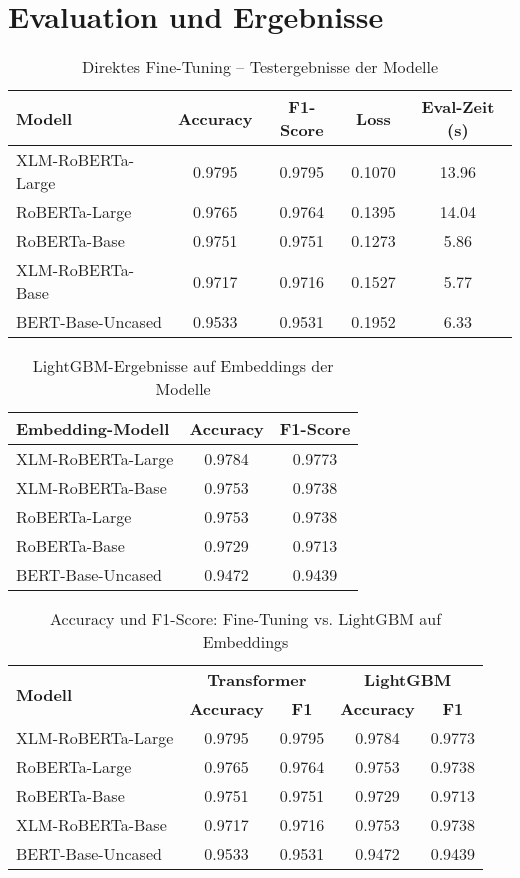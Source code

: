 \chapter{Evaluation und Ergebnisse}
\label{chap:evaluation_und_ergebnisse}


\begin{table}[!ht]
\centering
\begin{tabular}{lcccc}
    \toprule
    \textbf{Modell} & \textbf{Accuracy} & \textbf{F1-Score} & \textbf{Loss} & \textbf{Eval-Zeit (s)} \\
    \midrule
    XLM-RoBERTa-Large & 0.9795 & 0.9795 & 0.1070 & 13.96 \\
    RoBERTa-Large     & 0.9765 & 0.9764 & 0.1395 & 14.04 \\
    RoBERTa-Base      & 0.9751 & 0.9751 & 0.1273 & 5.86 \\
    XLM-RoBERTa-Base  & 0.9717 & 0.9716 & 0.1527 & 5.77 \\
    BERT-Base-Uncased & 0.9533 & 0.9531 & 0.1952 & 6.33 \\
    \bottomrule
\end{tabular}
\caption{Direktes Fine-Tuning – Testergebnisse der Modelle}
\end{table}


\begin{table}[!ht]
\centering
\begin{tabular}{lcc}
    \toprule
    \textbf{Embedding-Modell} & \textbf{Accuracy} & \textbf{F1-Score} \\
    \midrule
    XLM-RoBERTa-Large & 0.9784 & 0.9773 \\
    XLM-RoBERTa-Base  & 0.9753 & 0.9738 \\
    RoBERTa-Large     & 0.9753 & 0.9738 \\
    RoBERTa-Base      & 0.9729 & 0.9713 \\
    BERT-Base-Uncased & 0.9472 & 0.9439 \\
    \bottomrule
\end{tabular}
\caption{LightGBM-Ergebnisse auf Embeddings der Modelle}
\end{table}


\begin{table}[!ht]
\centering
\caption{Accuracy und F1-Score: Fine-Tuning vs. LightGBM auf Embeddings}
\begin{tabular}{lcccc}
\toprule
\multirow{2}{*}{\textbf{Modell}} &
\multicolumn{2}{c}{\textbf{Transformer}} &
\multicolumn{2}{c}{\textbf{LightGBM}} \\
\cmidrule(lr){2-3} \cmidrule(lr){4-5}
 & \textbf{Accuracy} & \textbf{F1} & \textbf{Accuracy} & \textbf{F1} \\
\midrule
XLM-RoBERTa-Large & 0.9795 & 0.9795 & 0.9784 & 0.9773 \\
RoBERTa-Large     & 0.9765 & 0.9764 & 0.9753 & 0.9738 \\
RoBERTa-Base      & 0.9751 & 0.9751 & 0.9729 & 0.9713 \\
XLM-RoBERTa-Base  & 0.9717 & 0.9716 & 0.9753 & 0.9738 \\
BERT-Base-Uncased & 0.9533 & 0.9531 & 0.9472 & 0.9439 \\
\bottomrule
\end{tabular}
\end{table}
